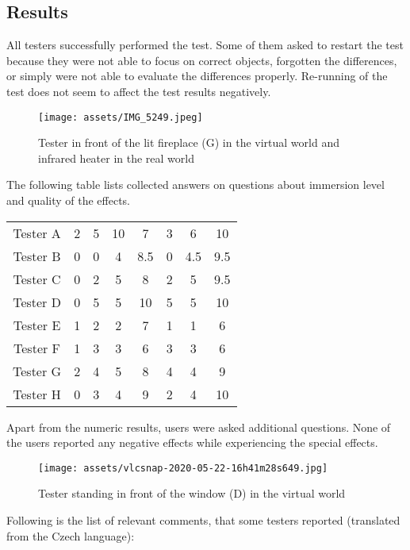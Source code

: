 \hypertarget{x-results}{\subsection{Results}}
All testers successfully performed the test. Some of them asked to
restart the test because they were not able to focus on correct objects,
forgotten the differences, or simply were not able to evaluate the
differences properly. Re-running of the test does not seem to affect the
test results negatively.


\begin{figure}[h]{}
\centering\texttt{[image: assets/IMG\_5249.jpeg]}
\caption{Tester in front of the lit fireplace (G) in the virtual world and infrared heater in the real world}

\end{figure}

The following table lists collected answers on questions about immersion level and
quality of the effects.


\begin{center}
\begin{tabular}{|c|c|c|c|c|c|c|c|}
\hline
Tester A & 2 & 5 & 10 & 7 & 3 & 6 & 10 \\ 
Tester B & 0 & 0 & 4 & 8.5 & 0 & 4.5 & 9.5 \\ 
Tester C & 0 & 2 & 5 & 8 & 2 & 5 & 9.5 \\ 
Tester D & 0 & 5 & 5 & 10 & 5 & 5 & 10 \\ 
Tester E & 1 & 2 & 2 & 7 & 1 & 1 & 6 \\ 
Tester F & 1 & 3 & 3 & 6 & 3 & 3 & 6 \\ 
Tester G & 2 & 4 & 5 & 8 & 4 & 4 & 9 \\ 
Tester H & 0 & 3 & 4 & 9 & 2 & 4 & 10 \\ 
\hline
\end{tabular}
\end{center}

Apart from the numeric results, users were asked additional questions.
None of the users reported any negative effects while experiencing the special
effects.


\begin{figure}[h]{}
\centering\texttt{[image: assets/vlcsnap-2020-05-22-16h41m28s649.jpg]}
\caption{Tester standing in front of the window (D) in the virtual world}

\end{figure}

Following is the list of relevant comments, that some testers reported
(translated from the Czech language):



